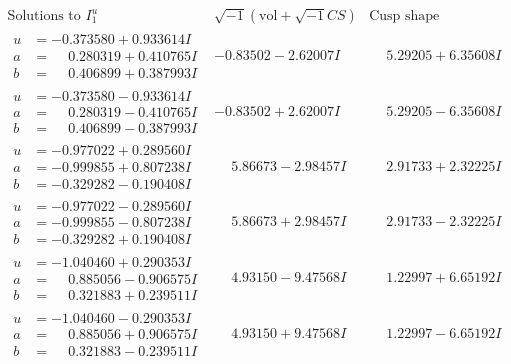 \documentclass[1p]{elsarticle_modified}
\theoremstyle{definition}
\newcommand{\I}{\sqrt{-1}}
\begin{document}
$$\begin{array}{c|c|c}  
\text{Solutions to }I^u_{1}& \I (\text{vol} + \sqrt{-1}CS) & \text{Cusp shape}\\
 \hline 
\begin{aligned}
u &= -0.373580 + 0.933614 I \\
a &= \phantom{-}0.280319 + 0.410765 I \\
b &= \phantom{-}0.406899 + 0.387993 I\end{aligned}
 & -0.83502 - 2.62007 I & \phantom{-}5.29205 + 6.35608 I \\ \hline\begin{aligned}
u &= -0.373580 - 0.933614 I \\
a &= \phantom{-}0.280319 - 0.410765 I \\
b &= \phantom{-}0.406899 - 0.387993 I\end{aligned}
 & -0.83502 + 2.62007 I & \phantom{-}5.29205 - 6.35608 I \\ \hline\begin{aligned}
u &= -0.977022 + 0.289560 I \\
a &= -0.999855 + 0.807238 I \\
b &= -0.329282 - 0.190408 I\end{aligned}
 & \phantom{-}5.86673 - 2.98457 I & \phantom{-}2.91733 + 2.32225 I \\ \hline\begin{aligned}
u &= -0.977022 - 0.289560 I \\
a &= -0.999855 - 0.807238 I \\
b &= -0.329282 + 0.190408 I\end{aligned}
 & \phantom{-}5.86673 + 2.98457 I & \phantom{-}2.91733 - 2.32225 I \\ \hline\begin{aligned}
u &= -1.040460 + 0.290353 I \\
a &= \phantom{-}0.885056 - 0.906575 I \\
b &= \phantom{-}0.321883 + 0.239511 I\end{aligned}
 & \phantom{-}4.93150 - 9.47568 I & \phantom{-}1.22997 + 6.65192 I \\ \hline\begin{aligned}
u &= -1.040460 - 0.290353 I \\
a &= \phantom{-}0.885056 + 0.906575 I \\
b &= \phantom{-}0.321883 - 0.239511 I\end{aligned}
 & \phantom{-}4.93150 + 9.47568 I & \phantom{-}1.22997 - 6.65192 I \\ \hline\begin{aligned}

\end{aligned}
\end{array}$$
\end{document}
